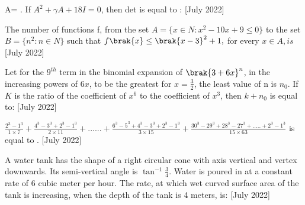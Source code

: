 \iffalse
  \title{2022}
  \author{ai24btech11005}
  \section{integer}
\fi
  \item A=  . If $A^2+\gamma A+ 18I=0$, then
  det is equal to :
    \hfill{[July 2022]}
    \item The number of functions f, from the set $A= \{x \in N: x^2-10x+9 \leq 0 \}$ to the set
    $B= \{ n^2 : n\in N\}$ such that $f\brak{x}\leq
     \brak{x-3}^2+1,$ for every $x \in A, is $
   \hfill{[July 2022]}
    \item Let for the $9^{th}$ term in the binomial expansion of $\brak{3+6x}^n$, in the increasing powers of $6x$, to be the greatest for $x=\frac{3}{2}$, the least value of n is $n_0$.  If $K$ 
    is the ratio of the coefficient of $x^6$ to the coefficient of $x^3$, then $k+n_0$ is equal to:
 \hfill{[July 2022]}

    \item $\frac{2^3-1^3}{1\times7} + \frac{4^3-3^3+2^3-1^3}{2\times 11} +......+\frac{6^3-5^3+4^3-3^3+2^3-1^3}{3\times 15} +\frac{30^3-29^3+28^3-27^3+.....+2^3-1^3}{15\times 63}$ is equal to .
\hfill{[July 2022]}
    \item A water tank has the shape of a right circular cone with axis vertical and vertex downwards. Its semi-vertical angle is $\tan^{-1}\frac{3}{4}$. Water is poured in at a constant rate of 6 cubic  meter per hour. The rate, at which wet curved surface area of the tank is increasing, when the depth of the tank is 4 meters, is:
   \hfill{[July 2022]}


